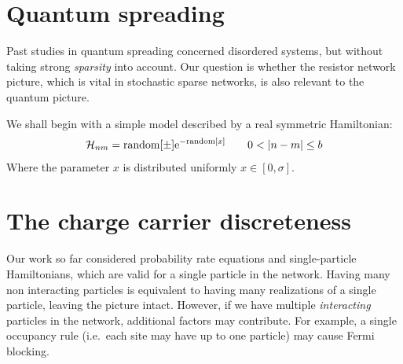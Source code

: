 \section{Quantum spreading}


Past studies in quantum spreading
\cite{cohen_wave_2000,izrailev_evolution_1997,venegas-andraca_quantum_2012,guarneri_spectral_1989,*guarneri_estimate_1993} concerned disordered systems, but
without taking strong \emph{sparsity} into account.
Our question is whether the resistor network picture,
which is vital in stochastic sparse networks, is also relevant to the quantum picture.


We shall begin with a simple model described by a real symmetric Hamiltonian:
%
\begin{align}
  \mathcal{H}_{nm} = \textrm{random}[\pm] \eexp{-\textrm{random}[x]} \qquad 0<|n-m|\le b
\end{align}
%
Where the parameter $x$ is distributed uniformly $x\in [0,\sigma]$. 


\section{The charge carrier discreteness}\label{sec:discreteness}

Our work so far considered probability rate equations and single-particle Hamiltonians, which are valid 
for a single particle in the network.
Having many non interacting particles is equivalent to having many 
realizations of a single particle, leaving the picture intact. 
However, if we have multiple \emph{interacting} particles in the network, 
additional factors may contribute. For example, a single occupancy rule 
(i.e.\ each site may have up to one particle) may cause Fermi blocking. 




